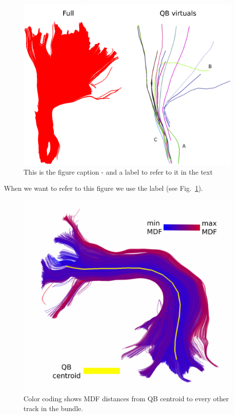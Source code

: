 \documentclass{bioinfo}
\begin{document}
\begin{figure}
\centerline{\includegraphics[width=160mm]{Figures/Fig_4_cst_simplification_relabeled_triple.eps}}
\caption{This is the figure caption - and a label to refer to it in the text \label{Fig:big_picture}}
\end{figure}

When we want to refer to this figure we use the label (see Fig.~\ref{Fig:big_picture}).

\begin{figure}
\includegraphics[scale=0.15]{Figures/Fig_11_MDF_arcuate}
\centering{}
\caption{Color coding shows MDF distances from QB centroid to every
  other track in the bundle.\label{Fig:little_picture}}
\end{figure}
\end{document}
